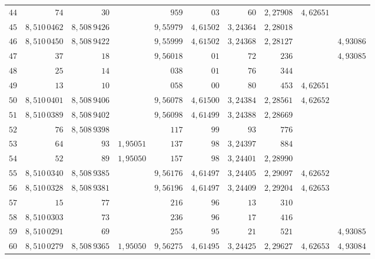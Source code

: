 \begin{center}
\begin{tabular}{r|r|r|r|r|r|r|r|r|r}
\(44\) & \(74\) & \(30\) &  & \(959\) & \(03\) & \(60\) & \(2{,}27908\) & \(4{,}62651\) &  \\
\(45\) & \(8{,}510\,0462\) & \(8{,}508\,9426\) &  & \(9{,}55979\) & \(4{,}61502\) & \(3{,}24364\) & \(2{,}28018\) &  &  \\
\hline
\(46\) & \(8{,}510\,0450\) & \(8{,}508\,9422\) &  & \(9{,}55999\) & \(4{,}61502\) & \(3{,}24368\) & \(2{,}28127\) &  & \(4{,}93086\) \\
\(47\) & \(37\) & \(18\) &  & \(9{,}56018\) & \(01\) & \(72\) & \(236\) &  & \(4{,}93085\) \\
\(48\) & \(25\) & \(14\) &  & \(038\) & \(01\) & \(76\) & \(344\) &  &  \\
\(49\) & \(13\) & \(10\) &  & \(058\) & \(00\) & \(80\) & \(453\) & \(4{,}62651\) &  \\
\(50\) & \(8{,}510\,0401\) & \(8{,}508\,9406\) &  & \(9{,}56078\) & \(4{,}61500\) & \(3{,}24384\) & \(2{,}28561\) & \(4{,}62652\) &  \\
\hline
\(51\) & \(8{,}510\,0389\) & \(8{,}508\,9402\) &  & \(9{,}56098\) & \(4{,}61499\) & \(3{,}24388\) & \(2{,}28669\) &  &  \\
\(52\) & \(76\) & \(8{,}508\,9398\) &  & \(117\) & \(99\) & \(93\) & \(776\) &  &  \\
\(53\) & \(64\) & \(93\) & \(1{,}95051\) & \(137\) & \(98\) & \(3{,}24397\) & \(884\) &  &  \\
\(54\) & \(52\) & \(89\) & \(1{,}95050\) & \(157\) & \(98\) & \(3{,}24401\) & \(2{,}28990\) &  &  \\
\(55\) & \(8{,}510\,0340\) & \(8{,}508\,9385\) &  & \(9{,}56176\) & \(4{,}61497\) & \(3{,}24405\) & \(2{,}29097\) & \(4{,}62652\) &  \\
\hline
\(56\) & \(8{,}510\,0328\) & \(8{,}508\,9381\) &  & \(9{,}56196\) & \(4{,}61497\) & \(3{,}24409\) & \(2{,}29204\) & \(4{,}62653\) &  \\
\(57\) & \(15\) & \(77\) &  & \(216\) & \(96\) & \(13\) & \(310\) &  &  \\
\(58\) & \(8{,}510\,0303\) & \(73\) &  & \(236\) & \(96\) & \(17\) & \(416\) &  &  \\
\(59\) & \(8{,}510\,0291\) & \(69\) &  & \(255\) & \(95\) & \(21\) & \(521\) &  & \(4{,}93085\) \\
\(60\) & \(8{,}510\,0279\) & \(8{,}508\,9365\) & \(1{,}95050\) & \(9{,}56275\) & \(4{,}61495\) & \(3{,}24425\) & \(2{,}29627\) & \(4{,}62653\) & \(4{,}93084\) \\
\end{tabular}
\endgroup
\end{center}

